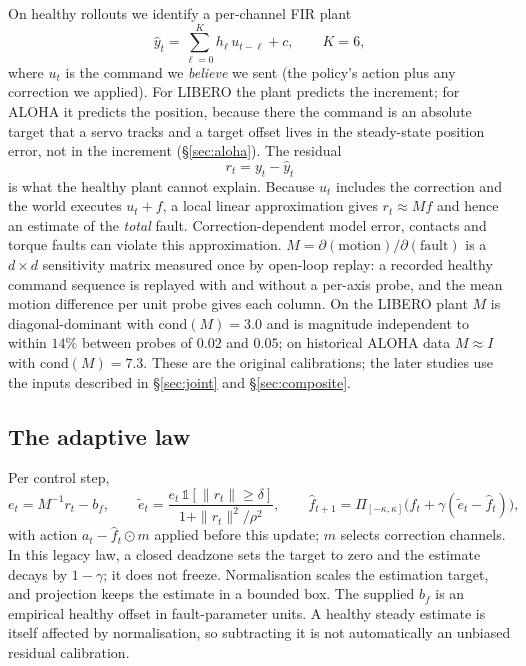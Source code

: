 \documentclass{article}
\newcommand{\fhat}{\hat{f}}
\begin{document}
On healthy rollouts we identify a per-channel FIR plant
\begin{equation}
\hat y_t = \sum_{\ell=0}^{K} h_\ell\, u_{t-\ell} + c, \qquad K = 6,
\end{equation}
where $u_t$ is the command we \emph{believe} we sent (the policy's action plus any
correction we applied). For LIBERO the plant predicts the increment; for ALOHA it predicts
the position, because there the command is an absolute target that a servo tracks and a
target offset lives in the steady-state position error, not in the increment
(\S\ref{sec:aloha}). The residual
\begin{equation}
r_t = y_t - \hat y_t
\end{equation}
is what the healthy plant cannot explain. Because $u_t$ includes the correction and the
world executes $u_t + f$, a local linear approximation gives $r_t \approx M f$ and hence
an estimate of the \emph{total} fault. Correction-dependent model error, contacts and torque
faults can violate this approximation. $M = \partial(\text{motion})/\partial(\text{fault})$ is a
$d\times d$ sensitivity matrix measured once by open-loop replay: a recorded healthy command
sequence is replayed with and without a per-axis probe, and the mean motion difference per
unit probe gives each column. On the LIBERO plant $M$ is diagonal-dominant with
$\mathrm{cond}(M)=3.0$ and is magnitude independent to within $14\%$ between probes of
$0.02$ and $0.05$; on historical ALOHA data $M\approx I$ with $\mathrm{cond}(M)=7.3$.
These are the original calibrations; the later studies use the inputs described in
\S\ref{sec:joint} and \S\ref{sec:composite}.

\subsection{The adaptive law}
\label{sec:law}

Per control step,
\begin{equation}
\label{eq:law}
e_t = M^{-1} r_t - b_f,\qquad
\tilde e_t = \frac{e_t\,\mathbb{1}[\|r_t\|\ge\delta]}{1+\|r_t\|^2/\rho^2},\qquad
\fhat_{t+1} = \Pi_{[-\kappa,\kappa]}\!\big(\fhat_t + \gamma(\tilde e_t - \fhat_t)\big),
\end{equation}
with action $a_t-\fhat_t\odot m$ applied before this update; $m$ selects correction channels.
In this legacy law, a closed deadzone sets the target to zero and the estimate decays by
$1-\gamma$; it does not freeze. Normalisation scales the estimation target, and projection
keeps the estimate in a bounded box. The supplied $b_f$ is an empirical healthy offset in
fault-parameter units. A healthy steady estimate is itself affected by normalisation, so
subtracting it is not automatically an unbiased residual calibration.
\end{document}
